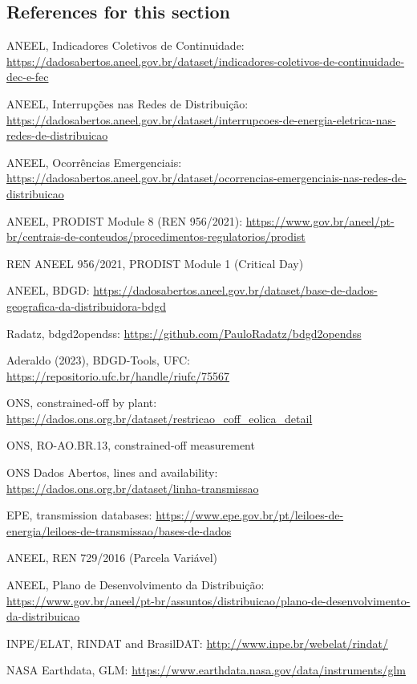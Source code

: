 \subsection*{References for this section}
{\small
\begin{enumerate}[label={[\arabic*]},leftmargin=2.2em,itemsep=1pt]
\item ANEEL, Indicadores Coletivos de Continuidade: \url{https://dadosabertos.aneel.gov.br/dataset/indicadores-coletivos-de-continuidade-dec-e-fec}
\item ANEEL, Interrupções nas Redes de Distribuição: \url{https://dadosabertos.aneel.gov.br/dataset/interrupcoes-de-energia-eletrica-nas-redes-de-distribuicao}
\item ANEEL, Ocorrências Emergenciais: \url{https://dadosabertos.aneel.gov.br/dataset/ocorrencias-emergenciais-nas-redes-de-distribuicao}
\item ANEEL, PRODIST Module 8 (REN 956/2021): \url{https://www.gov.br/aneel/pt-br/centrais-de-conteudos/procedimentos-regulatorios/prodist}
\item REN ANEEL 956/2021, PRODIST Module 1 (Critical Day)
\item ANEEL, BDGD: \url{https://dadosabertos.aneel.gov.br/dataset/base-de-dados-geografica-da-distribuidora-bdgd}
\item Radatz, bdgd2opendss: \url{https://github.com/PauloRadatz/bdgd2opendss}
\item Aderaldo (2023), BDGD-Tools, UFC: \url{https://repositorio.ufc.br/handle/riufc/75567}
\item[] 
\item ONS, constrained-off by plant: \url{https://dados.ons.org.br/dataset/restricao_coff_eolica_detail}
\item ONS, RO-AO.BR.13, constrained-off measurement
\item ONS Dados Abertos, lines and availability: \url{https://dados.ons.org.br/dataset/linha-transmissao}
\item EPE, transmission databases: \url{https://www.epe.gov.br/pt/leiloes-de-energia/leiloes-de-transmissao/bases-de-dados}
\item ANEEL, REN 729/2016 (Parcela Variável)
\item ANEEL, Plano de Desenvolvimento da Distribuição: \url{https://www.gov.br/aneel/pt-br/assuntos/distribuicao/plano-de-desenvolvimento-da-distribuicao}
\item INPE/ELAT, RINDAT and BrasilDAT: \url{http://www.inpe.br/webelat/rindat/}
\item NASA Earthdata, GLM: \url{https://www.earthdata.nasa.gov/data/instruments/glm}

\end{enumerate}}
